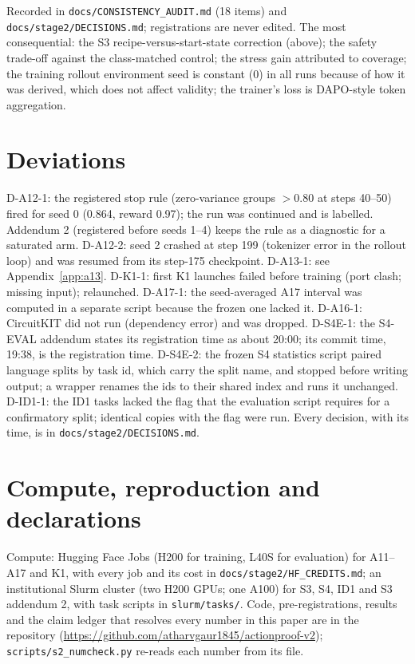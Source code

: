 Recorded in \texttt{docs/CONSISTENCY\_AUDIT.md} (18 items) and \texttt{docs/stage2/DECISIONS.md}; registrations are never edited. The most consequential: the S3 recipe-versus-start-state correction (above); the safety trade-off against the class-matched control; the stress gain attributed to coverage; the training rollout environment seed is constant (0) in all runs because of how it was derived, which does not affect validity; the trainer's loss is DAPO-style token aggregation.

\section{Deviations}
\label{app:dev}

D-A12-1: the registered stop rule (zero-variance groups $>$0.80 at steps 40--50) fired for \RA{} seed 0 (0.864, reward 0.97); the run was continued and is labelled. Addendum 2 (registered before seeds 1--4) keeps the rule as a diagnostic for a saturated arm. D-A12-2: \RV{} seed 2 crashed at step 199 (tokenizer error in the rollout loop) and was resumed from its step-175 checkpoint. D-A13-1: see Appendix~\ref{app:a13}. D-K1-1: first K1 launches failed before training (port clash; missing input); relaunched. D-A17-1: the seed-averaged A17 interval was computed in a separate script because the frozen one lacked it. D-A16-1: CircuitKIT did not run (dependency error) and was dropped. D-S4E-1: the S4-EVAL addendum states its registration time as about 20:00; its commit time, 19:38, is the registration time. D-S4E-2: the frozen S4 statistics script paired language splits by task id, which carry the split name, and stopped before writing output; a wrapper renames the ids to their shared index and runs it unchanged. D-ID1-1: the ID1 tasks lacked the flag that the evaluation script requires for a confirmatory split; identical copies with the flag were run. Every decision, with its time, is in \texttt{docs/stage2/DECISIONS.md}.

\section{Compute, reproduction and declarations}
\label{app:repro}

Compute: Hugging Face Jobs (H200 for training, L40S for evaluation) for A11--A17 and K1, with every job and its cost in \texttt{docs/stage2/HF\_CREDITS.md}; an institutional Slurm cluster (two H200 GPUs; one A100) for S3, S4, ID1 and S3 addendum 2, with task scripts in \texttt{slurm/tasks/}. Code, pre-registrations, results and the claim ledger that resolves every number in this paper are in the repository (\url{https://github.com/atharvgaur1845/actionproof-v2}); \texttt{scripts/s2\_numcheck.py} re-reads each number from its file.

